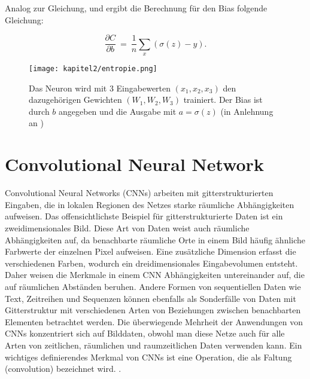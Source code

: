   Analog zur Gleichung\label{Formel2_9}, \label{Formel2_10} und \label{Formel2_11} ergibt die Berechnung für den Bias folgende Gleichung:

  \begin{equation}
    \frac{\partial C}{\partial b} \ =\ \frac{1}{n}\sum _{x}( \sigma ( z) -y).
  \end{equation}

  \begin{figure}[H]
    \centering
    \texttt{[image: kapitel2/entropie.png]}
    \caption[Darstellung der Kreuzentropie am beispiel eines Neurons]{Das Neuron wird mit 3 Eingabewerten $(x_1, x_2, x_3)$ den dazugehörigen Gewichten $(W_1, W_2, W_3)$ trainiert. Der Bias ist durch $b$ angegeben und die Ausgabe mit $a = \sigma(z)$ (in Anlehnung an \cite*{Nielsen2015})}
    \label{Kap2:Entropie}
  \end{figure}

  \section{Convolutional Neural Network}
  Convolutional Neural Networks (CNNs) arbeiten mit gitterstrukturierten Eingaben, die in lokalen Regionen des Netzes starke räumliche Abhängigkeiten aufweisen. Das offensichtlichste Beispiel für gitterstrukturierte Daten ist ein zweidimensionales Bild. Diese Art von Daten weist auch räumliche Abhängigkeiten auf, da benachbarte räumliche Orte in einem Bild häufig ähnliche Farbwerte der einzelnen Pixel aufweisen. Eine zusätzliche Dimension erfasst die verschiedenen Farben, wodurch ein dreidimensionales Eingabevolumen entsteht. Daher weisen die Merkmale in einem CNN Abhängigkeiten untereinander auf, die auf räumlichen Abständen beruhen. Andere Formen von sequentiellen Daten wie Text, Zeitreihen und Sequenzen können ebenfalls als Sonderfälle von Daten mit Gitterstruktur mit verschiedenen Arten von Beziehungen zwischen benachbarten Elementen betrachtet werden. Die überwiegende Mehrheit der Anwendungen von CNNs konzentriert sich auf Bilddaten, obwohl man diese Netze auch für alle Arten von zeitlichen, räumlichen und raumzeitlichen Daten verwenden kann. Ein wichtiges definierendes Merkmal von CNNs ist eine Operation, die als Faltung (convolution) bezeichnet wird. \cite*[315-316]{Aggarwal2018}.

